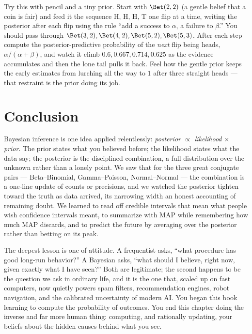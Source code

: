 \begin{labbox}
Try this with pencil and a tiny prior. Start with $\Bet(2,2)$ (a gentle belief that a coin
is fair) and feed it the sequence H, H, H, T one flip at a time, writing the posterior
after each flip using the rule ``add a success to $\alpha$, a failure to $\beta$.'' You
should pass through $\Bet(3,2),\Bet(4,2),\Bet(5,2),\Bet(5,3)$. After each step compute the
posterior-predictive probability of the \emph{next} flip being heads, $\alpha/(\alpha+\beta)$,
and watch it climb $0.6, 0.667, 0.714, 0.625$ as the evidence accumulates and then the lone
tail pulls it back. Feel how the gentle prior keeps the early estimates from lurching all
the way to $1$ after three straight heads --- that restraint is the prior doing its job.
\end{labbox}

\section{Conclusion}
\label{ch31:conclusion}

Bayesian inference is one idea applied relentlessly: \emph{posterior $\propto$ likelihood
$\times$ prior}. The prior states what you believed before; the likelihood states what the
data say; the posterior is the disciplined combination, a full distribution over the
unknown rather than a lonely point. We saw that for the three great conjugate pairs ---
Beta--Binomial, Gamma--Poisson, Normal--Normal --- the combination is a one-line update of
counts or precisions, and we watched the posterior tighten toward the truth as data
arrived, its narrowing width an honest accounting of remaining doubt. We learned to read
off credible intervals that mean what people wish confidence intervals meant, to summarize
with MAP while remembering how much MAP discards, and to predict the future by averaging
over the posterior rather than betting on its peak.

The deepest lesson is one of attitude. A frequentist asks, ``what procedure has good
long-run behavior?'' A Bayesian asks, ``what should I believe, right now, given exactly
what I have seen?'' Both are legitimate; the second happens to be the question we ask in
ordinary life, and it is the one that, scaled up on fast computers, now quietly powers
spam filters, recommendation engines, robot navigation, and the calibrated uncertainty of
modern AI. You began this book learning to compute the probability of outcomes. You end
this chapter doing the inverse and far more human thing: computing, and rationally
updating, your beliefs about the hidden causes behind what you see.

